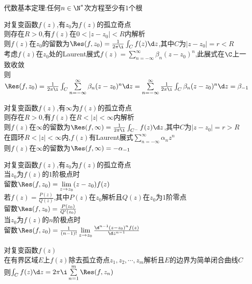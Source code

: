 \begin{dingli}
代数基本定理:任何$n\in \N^*$次方程至少有$1$个根
\end{dingli}

\begin{dingyi}
对复变函数$f(z)$,有$z_0$为$f(z)$的孤立奇点\\
则存在$R>0$,有$f(z)$在$0<|z-z_0|<R$内解析\\
则$f(z)$在$z_0$的留数为$\Res(f,z_0)=\frac{1}{2\pi\i}\int_{C}f(z)\d z$,其中$C$为$|z-z_0|=r<R$\\
考虑$f(z)$在$z_0$处的Laurent展式$f(z)=\sum\limits_{n=-\infty}^{\infty}\beta_n(z-z_0)^n$,此展式在$\C$上一致收敛\\
则$\Res(f,z_0)=\frac{1}{2\pi\i}\int_{C}\sum\limits_{n=-\infty}^{\infty}\beta_n(z-z_0)^n\d z=\sum\limits_{n=-\infty}^{\infty}\frac{1}{2\pi\i}\int_{C}\beta_n(z-z_0)^n\d z=\beta_{-1}$
\end{dingyi}

\begin{dingyi}
对复变函数$f(z)$,有$\infty$为$f(z)$的孤立奇点\\
则存在$R>0$,有$f(z)$在$R<|z|<\infty$内解析\\
则$f(z)$在$\infty$的留数为$\Res(f,\infty)=\frac{1}{2\pi\i}\int_{C^{-}}f(z)\d z$,其中$C$为$|z-z_0|=r>R$\\
在圆环$R<|z|<\infty$内,$f(z)$有Laurent展式$\sum\limits_{n=-\infty}^{\infty}\alpha_nz^n$\\
则$f(z)$在$\infty$的留数为$\Res(f,\infty)=-\alpha_{-1}$
\end{dingyi}

\begin{dingli}
对复变函数$f(z)$,有$z_0$为$f(z)$的孤立奇点\\
当$z_0$为$f(z)$的$1$阶极点时\\
留数$\Res(f,z_0)=\lim\limits_{z\to z_0}(z-z_0)f(z)$\\
若$f(z)=\frac{P(z)}{Q(z)}$,其中$P(z)$在$z_0$解析且$Q(z)$在$z_0$为$1$阶零点\\
留数$\Res(f,z_0)=\frac{P(z_0)}{Q'(z_0)}$\\
当$z_0$为$f(z)$的$n$阶极点时\\
留数$\Res(f,z_0)=\frac{1}{(n-1)!}\lim\limits_{z\to z_0}\frac{\d^{n-1}(z-z_0)^nf(z)}{\d z^{n-1}}$
\end{dingli}

\begin{dingli}
对复变函数$f(z)$\\
在有界区域$E$上$f(z)$除去孤立奇点$z_1,z_2,\cdots,z_m$解析且$E$的边界为简单闭合曲线$C$\\
则$\int_{C}f(z)\d z=2\pi\i\sum\limits_{n=1}^{m}\Res(f,z_n)$
\end{dingli}

